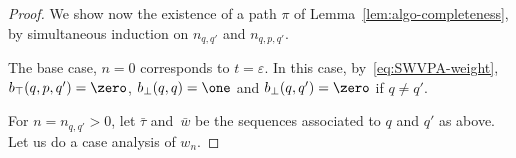 \begin{proof}
\noindent
We show now the existence of a path $\pi$ of Lemma~\ref{lem:algo-completeness}, 
by simultaneous induction on $n_{q, q'}$ and $n_{q, p, q'}$.

The base case, $n = 0$ corresponds to $t = \varepsilon$. 
In this case, by~\eqref{eq:SWVPA-weight}, $b_\top(q, p, q') = \zero$,
$b_\bot(q, q) = \one$ and $b_\bot(q, q') = \zero$ if $q \neq q'$.

\noindent
For $n = n_{q, q'} > 0$, let $\bar\tau$ and~$\bar{w}$
be the sequences associated to $q$ and $q'$ as above.
Let us do a case analysis of $w_n$.



 

\end{proof}




